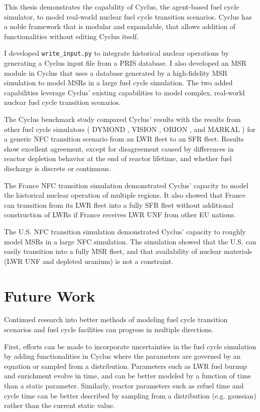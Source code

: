 This thesis demonstrates the capability of Cyclus, the agent-based
fuel cycle simulator, to model real-world nuclear fuel cycle
transition scenarios. Cyclus has a noble framework that is
modular and expandable, that allows addition of functionalities
without editing Cyclus itself.

I developed \texttt{write\_input.py}
to integrate historical nuclear operations by generating
a Cyclus input file from a \gls{PRIS} database. I also
developed an \gls{MSR} module in Cyclus that uses a database
generated by a high-fidelity \gls{MSR} simulation to model
\glspl{MSR} in a large fuel cycle simulation. The two
added capabilities leverage Cyclus' existing capabilities
to model complex, real-world nuclear fuel cycle transition
scenarios.

The Cyclus benchmark study compared Cyclus' results with
the results from other fuel cycle simulators
(
DYMOND \cite{yacout_modeling_2005},
VISION \cite{jacobson_verifiable_2010},
ORION \cite{gregg_analysis_2012}, and
MARKAL \cite{shay_epa_2006}
) for a generic \gls{NFC} transition scenario from an
\gls{LWR} fleet to an \gls{SFR} fleet. Results show
excellent agreement, except for disagreement caused 
by differences in reactor depletion
behavior at the end of reactor lifetime, and
whether fuel discharge is discrete or continuous.

The France \gls{NFC} transition simulation demonstrated
Cyclus' capacity to model the historical nuclear operation
of multiple regions. It also showed that
France can transition from its \gls{LWR} fleet into a fully \gls{SFR} fleet
without additional construction of \glspl{LWR} if France receives
\gls{LWR} \gls{UNF} from other \gls{EU} nations.

The U.S. \gls{NFC} transition simulation demonstrated
Cyclus' capacity to roughly model \glspl{MSR} in
a large \gls{NFC} simulation. The simulation showed
that the U.S. can easily transition into a fully
\gls{MSR} fleet, and that availability of nuclear materials
(\gls{LWR} \gls{UNF} and depleted uranium) is not a constraint.



\section{Future Work}
Continued research into better methods of modeling fuel cycle
transition scenarios and fuel cycle facilities can progress
in multiple directions. 

First, efforts can be made to incorporate
uncertainties in the fuel cycle simulation by adding functionalities
in Cyclus where the parameters are governed by an equation
or sampled from a distribution. Parameters such as \gls{LWR} fuel
burnup and enrichment evolve in time, and can be better modeled
by a function of time than a static parameter. Similarly, reactor parameters
such as refuel time and cycle time can be better described by sampling
from a distribution (e.g. gaussian) rather than the current static
value.

